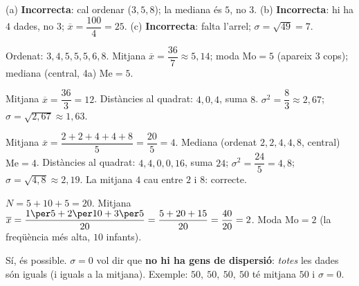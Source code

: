 \begin{solucions}
\begin{sollist}
  \item (a) \textbf{Incorrecta}: cal ordenar ($3,5,8$); la mediana és $5$, no $3$.
        \quad (b) \textbf{Incorrecta}: hi ha $4$ dades, no $3$;
        $\overline{x}=\dfrac{100}{4}=25$. \quad (c) \textbf{Incorrecta}: falta l'arrel;
        $\sigma=\sqrt{49}=7$.
  \item Ordenat: $3,4,5,5,5,6,8$. Mitjana
        $\overline{x}=\dfrac{36}{7}\approx 5,14$; moda $\text{Mo}=5$ (apareix $3$
        cops); mediana (central, 4a) $\text{Me}=5$.
  \item Mitjana $\overline{x}=\dfrac{36}{3}=12$. Distàncies al quadrat: $4,0,4$, suma
        $8$. $\sigma^2=\dfrac{8}{3}\approx 2,67$;
        $\sigma=\sqrt{2,67}\approx 1,63$.
  \item Mitjana $\overline{x}=\dfrac{2+2+4+4+8}{5}=\dfrac{20}{5}=4$. Mediana (ordenat
        $2,2,4,4,8$, central) $\text{Me}=4$. Distàncies al quadrat: $4,4,0,0,16$, suma
        $24$; $\sigma^2=\dfrac{24}{5}=4,8$; $\sigma=\sqrt{4,8}\approx 2,19$. La mitjana
        $4$ cau entre $2$ i $8$: correcte.
  \item $N=5+10+5=20$. Mitjana
        $\overline{x}=\dfrac{1\per 5+2\per 10+3\per 5}{20}=\dfrac{5+20+15}{20}=\dfrac{40}{20}=2$.
        Moda $\text{Mo}=2$ (la freqüència més alta, $10$ infants).
  \item Sí, és possible. $\sigma=0$ vol dir que \textbf{no hi ha gens de dispersió}:
        \emph{totes} les dades són iguals (i iguals a la mitjana). Exemple:
        $50,\ 50,\ 50,\ 50$ té mitjana $50$ i $\sigma=0$.
\end{sollist}
\end{solucions}
